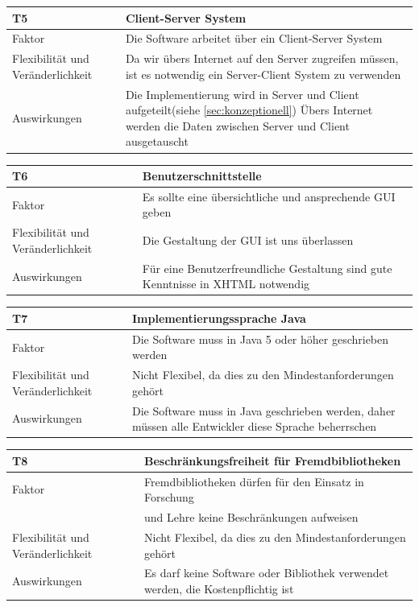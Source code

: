\documentclass[fontsize=12pt,paper=a4,twoside]{scrartcl}
\begin{document}
\begin{table}[H]
\begin{tabular}{|p{3cm}|p{12cm}|}\hline
T5 & Client-Server System \\ \hline
Faktor & Die Software arbeitet über ein Client-Server System\\ \hline
Flexibilität und Veränderlichkeit & Da wir übers Internet auf den Server zugreifen müssen, ist es notwendig ein Server-Client System zu verwenden \\ \hline
Auswirkungen & Die Implementierung wird in Server und Client aufgeteilt(siehe \ref{sec:konzeptionell}) Übers Internet werden die Daten zwischen Server und Client ausgetauscht\\ \hline
\end{tabular}
\end{table}

\begin{table}[H]
\begin{tabular}{|p{3cm}|p{12cm}|}\hline
T6 & Benutzerschnittstelle \\ \hline
Faktor & Es sollte eine übersichtliche und ansprechende GUI geben\\ \hline
Flexibilität und Veränderlichkeit & Die Gestaltung der GUI ist uns überlassen \\ \hline
Auswirkungen & Für eine Benutzerfreundliche Gestaltung sind gute Kenntnisse in XHTML notwendig\\ \hline
\end{tabular}
\end{table}

\begin{table}[H]
\begin{tabular}{|p{3cm}|p{12cm}|}\hline
T7 & Implementierungssprache Java \\ \hline
Faktor & Die Software muss in Java 5 oder höher geschrieben werden\\ \hline
Flexibilität und Veränderlichkeit & Nicht Flexibel, da dies zu den Mindestanforderungen gehört\\ \hline
Auswirkungen & Die Software muss in Java geschrieben werden, daher müssen alle Entwickler diese Sprache beherrschen \\ \hline
\end{tabular}
\end{table}

\begin{table}[H]
\begin{tabular}{|p{3cm}|p{12cm}|}\hline
T8 & Beschränkungsfreiheit für Fremdbibliotheken\\ \hline
Faktor & Fremdbibliotheken dürfen für den Einsatz in Forschung\\
& und Lehre keine Beschränkungen aufweisen \\ \hline
Flexibilität und Veränderlichkeit & Nicht Flexibel, da dies zu den Mindestanforderungen gehört\\ \hline
Auswirkungen & Es darf keine Software oder Bibliothek verwendet werden, die Kostenpflichtig ist \\ \hline
\end{tabular}
\end{table}
\end{document}
